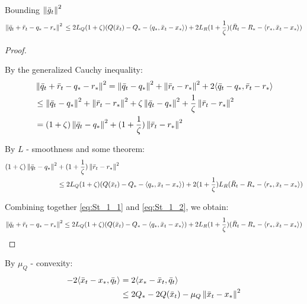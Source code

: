 \begin{lemma} \label{lem:g_t}
    Bounding $\left\|\bar{g}_t\right\|^2$
    \[  \left\|\bar{q}_t + \bar{r}_t - q_* - r_*\right\|^2 \\
        \leq
        2 L_Q(1 + \zeta)  (Q(\bar{x}_t) - Q_* - \langle q_*, \bar{x}_t - x_*\rangle)
        + 2 L_R(1 + \frac{1}{\zeta})  (\bar{R}_t - R_* - \langle r_*, \bar{x}_t - x_*\rangle)
    \]
\end{lemma}
\begin{proof}
$ $\par
    By the generalized Cauchy inequality:
    \begin{align}
        &\left\|\bar{q}_t + \bar{r}_t - q_* - r_*\right\|^2
        = \left\|\bar{q}_t - q_*\right\|^2 
        + \left\|\bar{r}_t - r_*\right\|^2
        + 2\langle \bar{q}_t - q_*, \bar{r}_t - r_*\rangle \label{eq:St_1_1} \\
        &\leq \left\|\bar{q}_t - q_*\right\|^2 
        + \left\|\bar{r}_t - r_*\right\|^2 
        + \zeta \left\|\bar{q}_t - q_*\right\|^2 
        + \frac{1}{\zeta} \left\|\bar{r}_t - r_*\right\|^2 \label{eq:St_1_2} \\
        &= (1 + \zeta)\left\|\bar{q}_t - q_*\right\|^2 + (1 + \frac{1}{\zeta})\left\|\bar{r}_t - r_*\right\|^2  \label{eq:St_1_1}
    \end{align}
    
    By $L$ - smoothness and some theorem:
    \begin{align}
        (1 + \zeta)\left\|\bar{q}_t - q_*\right\|^2 &+ (1 + \frac{1}{\zeta})\left\|\bar{r}_t - r_*\right\|^2 \\
        &\leq 2 L_Q(1 + \zeta)  (Q(\bar{x}_t) - Q_* - \langle q_*, \bar{x}_t - x_*\rangle)
        + 2(1 + \frac{1}{\zeta}) L_R (\bar{R}_t - R_* - \langle r_*, \bar{x}_t - x_*\rangle) \label{eq:St_1_2}
    \end{align}
    
    Combining together \eqref{eq:St_1_1} and \eqref{eq:St_1_2}, we obtain:
    \begin{align}
        \left\|\bar{q}_t + \bar{r}_t - q_* - r_*\right\|^2 
        \leq 2 L_Q(1 + \zeta)  (Q(\bar{x}_t) - Q_* - \langle q_*, \bar{x}_t - x_*\rangle)
        + 2 L_R(1 + \frac{1}{\zeta})  (\bar{R}_t - R_* - \langle r_*, \bar{x}_t - x_*\rangle) \label{eq:St_1}
    \end{align}
\end{proof}


\begin{lemma} \label{lem:inner_1}
    By $\mu_Q$ - convexity:
    \begin{align}
        -2 \langle \bar{x}_t - x_*, \bar{q}_t\rangle &= 2 \langle x_* - \bar{x}_t, \bar{q}_t\rangle \\
        &\leq 2 Q_* - 2 Q(\bar{x}_t) - \mu_Q \left\|\bar{x}_t - x_*\right\|^2 \label{eq:St_2}
    \end{align}
\end{lemma}

